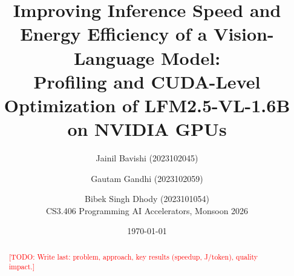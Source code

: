 \documentclass[11pt,a4paper]{article}
\title{Improving Inference Speed and Energy Efficiency of a Vision-Language Model:\\
       Profiling and CUDA-Level Optimization of LFM2.5-VL-1.6B on NVIDIA GPUs}
\author{Jainil Bavishi (2023102045) \and Gautam Gandhi (2023102059) \and Bibek Singh Dhody (2023101054)\\[4pt]
        \small CS3.406 Programming AI Accelerators, Monsoon 2026}
\date{\today}
\newcommand{\todo}[1]{\textcolor{red}{[TODO: #1]}}
\begin{document}
\maketitle

\begin{abstract}
\todo{Write last: problem, approach, key results (speedup, J/token), quality impact.}
\end{abstract}













\end{document}
